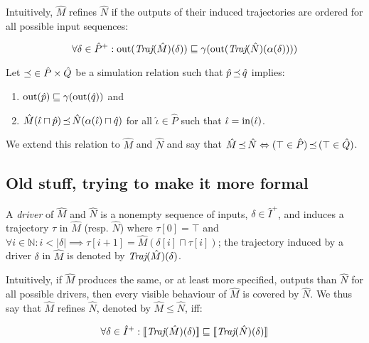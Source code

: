 Intuitively, $\hat M$ refines $\hat N$ if the outputs of their induced trajectories are ordered for all possible input sequences:


\begin{equation*}
\forall \delta \in \hat P^{+} : \operatorname{out}(\textit{Traj}(\hat M)(\delta)) \sqsubseteq \operatorname{\gamma}(\operatorname{out}(\textit{Traj}(\hat N)(\operatorname{\alpha}(\delta))))
\end{equation*}

Let $\operatorname{\mathrel{\preceq}} \in \hat P \times \hat Q$ be a simulation relation such that $\hat p \operatorname{\mathrel{\preceq}} \hat q$ implies:

\begin{enumerate}
\item $\operatorname{out}(\hat p) \sqsubseteq \gamma(\operatorname{out}(\hat q))$ and
\item $\hat M(\hat \iota \sqcap \hat p) \operatorname{\mathrel{\preceq}} \hat N(\operatorname{\alpha}(\hat \iota) \sqcap \hat q)$ for all $\hat \iota \in \hat P$ such that $\hat \iota = \operatorname{in}(\hat \iota)$.
\end{enumerate}

\noindent We extend this relation to $\hat M$ and $\hat N$ and say that $\hat M \operatorname{\mathrel{\preceq}} \hat N \Leftrightarrow (\top \in \hat P) \operatorname{\mathrel{\preceq}} \, (\top \in \hat Q)$.

\subsection{Old stuff, trying to make it more formal}

A \textit{driver} of $\hat M$ and $\hat N$ is a nonempty sequence of inputs, $\delta \in \hat I^{+}$, and induces a trajectory $\tau$ in $\hat M$ (resp. $\hat N$) where $\tau[0] = \top$ and $\forall i \in \mathbb{N} : i < | \delta | \implies \tau[i+1] = \hat M(\delta[i] \sqcap \tau[i])$; the trajectory induced by a driver $\delta$ in $\hat M$ is denoted by $\textit{Traj}(\hat M)(\delta)$.

Intuitively, if $\hat M$ produces the same, or at least more specified, outputs than $\hat N$ for all possible drivers, then every visible behaviour of $\hat M$ is covered by $\hat N$. We thus say that $\hat M$ refines $\hat N$, denoted by $\hat M \leq \hat N$, iff:



\begin{equation*}
\forall \delta \in \hat I^{+} : \llbracket\textit{Traj}(\hat M)(\delta)\rrbracket \sqsubseteq \llbracket\textit{Traj}(\hat N)(\delta)\rrbracket
\end{equation*}

